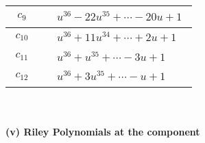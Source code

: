 \documentclass[1p]{elsarticle_modified}
\theoremstyle{definition}
\begin{document}
\begin{tabular}{m{50pt}|m{274pt}}
\hline $$\begin{aligned}c_{9}\end{aligned}$$&$\begin{aligned}
&u^{36}-22 u^{35}+\cdots-20 u+1
\end{aligned}$\\
\hline $$\begin{aligned}c_{10}\end{aligned}$$&$\begin{aligned}
&u^{36}+11 u^{34}+\cdots+2 u+1
\end{aligned}$\\
\hline $$\begin{aligned}c_{11}\end{aligned}$$&$\begin{aligned}
&u^{36}+u^{35}+\cdots-3 u+1
\end{aligned}$\\
\hline $$\begin{aligned}c_{12}\end{aligned}$$&$\begin{aligned}
&u^{36}+3 u^{35}+\cdots- u+1
\end{aligned}$\\
\hline
\end{tabular}\\~\\
\newpage\renewcommand{\arraystretch}{1}
\flushleft \textbf{(v) Riley Polynomials at the component}\newline \\
\end{document}
